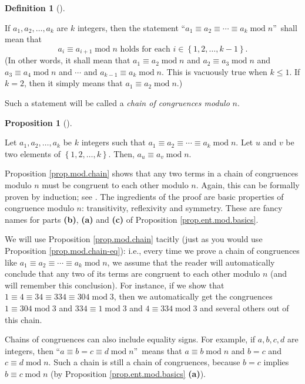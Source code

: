 \documentclass[numbers=enddot,12pt,final,onecolumn,notitlepage]{scrartcl}%
\numberwithin{exer}{subsection}
\theoremstyle{definition}
\newtheorem{prop}[theo]{Proposition}
\newenvironment{proposition}[1][]
{\begin{prop}[#1]\begin{leftbar}}
{\end{leftbar}\end{prop}}
\newtheorem{defi}[theo]{Definition}
\newenvironment{definition}[1][]
{\begin{defi}[#1]\begin{leftbar}}
{\end{leftbar}\end{defi}}
\begin{document}
\begin{definition}
If $a_{1},a_{2},\ldots,a_{k}$ are $k$ integers, then the statement
\textquotedblleft$a_{1}\equiv a_{2}\equiv\cdots\equiv a_{k}\operatorname{mod}%
n$\textquotedblright\ shall mean that
\[
a_{i}\equiv a_{i+1}\operatorname{mod}n\text{ holds for each }i\in\left\{
1,2,\ldots,k-1\right\}  .
\]
(In other words, it shall mean that $a_{1}\equiv a_{2}\operatorname{mod}n$ and
$a_{2}\equiv a_{3}\operatorname{mod}n$ and $a_{3}\equiv a_{4}%
\operatorname{mod}n$ and $\cdots$ and $a_{k-1}\equiv a_{k}\operatorname{mod}%
n$. This is vacuously true when $k\leq1$. If $k=2$, then it simply means that
$a_{1}\equiv a_{2}\operatorname{mod}n$.)

Such a statement will be called a \textit{chain of congruences modulo }$n$.
\end{definition}

\begin{proposition}
\label{prop.mod.chain}Let $a_{1},a_{2},\ldots,a_{k}$ be $k$ integers such that
$a_{1}\equiv a_{2}\equiv\cdots\equiv a_{k}\operatorname{mod}n$. Let $u$ and
$v$ be two elements of $\left\{  1,2,\ldots,k\right\}  $. Then, $a_{u}\equiv
a_{v}\operatorname{mod}n$.
\end{proposition}

Proposition \ref{prop.mod.chain} shows that any two terms in a chain of
congruences modulo $n$ must be congruent to each other modulo $n$. Again, this
can be formally proven by induction; see \cite[proof of Proposition
2.16]{detnotes}. The ingredients of the proof are basic properties of
congruence modulo $n$: transitivity, reflexivity and symmetry. These are fancy
names for parts \textbf{(b)}, \textbf{(a)} and \textbf{(c)} of Proposition
\ref{prop.ent.mod.basics}.

We will use Proposition \ref{prop.mod.chain} tacitly (just as you would use
Proposition \ref{prop.mod.chain-eq}): i.e., every time we prove a chain of
congruences like $a_{1}\equiv a_{2}\equiv\cdots\equiv a_{k}\operatorname{mod}%
n$, we assume that the reader will automatically conclude that any two of its
terms are congruent to each other modulo $n$ (and will remember this
conclusion). For instance, if we show that $1\equiv4\equiv34\equiv
334\equiv304\operatorname{mod}3$, then we automatically get the congruences
$1\equiv304\operatorname{mod}3$ and $334\equiv1\operatorname{mod}3$ and
$4\equiv334\operatorname{mod}3$ and several others out of this chain.

Chains of congruences can also include equality signs. For example, if
$a,b,c,d$ are integers, then \textquotedblleft$a\equiv b=c\equiv
d\operatorname{mod}n$\textquotedblright\ means that $a\equiv
b\operatorname{mod}n$ and $b=c$ and $c\equiv d\operatorname{mod}n$. Such a
chain is still a chain of congruences, because $b=c$ implies $b\equiv
c\operatorname{mod}n$ (by Proposition \ref{prop.ent.mod.basics} \textbf{(a)}).
\end{document}
